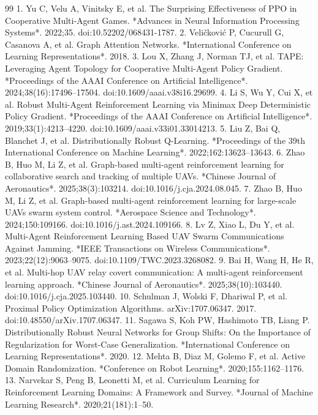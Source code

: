 \begin{thebibliography}{99}
 1. Yu C, Velu A, Vinitsky E, et al. The Surprising Effectiveness of PPO in Cooperative Multi-Agent Games. *Advances in Neural Information Processing Systems*. 2022;35. doi:10.52202/068431-1787.
 2. Veličković P, Cucurull G, Casanova A, et al. Graph Attention Networks. *International Conference on Learning Representations*. 2018.
 3. Lou X, Zhang J, Norman TJ, et al. TAPE: Leveraging Agent Topology for Cooperative Multi-Agent Policy Gradient. *Proceedings of the AAAI Conference on Artificial Intelligence*. 2024;38(16):17496--17504. doi:10.1609/aaai.v38i16.29699.
 4. Li S, Wu Y, Cui X, et al. Robust Multi-Agent Reinforcement Learning via Minimax Deep Deterministic Policy Gradient. *Proceedings of the AAAI Conference on Artificial Intelligence*. 2019;33(1):4213--4220. doi:10.1609/aaai.v33i01.33014213.
 5. Liu Z, Bai Q, Blanchet J, et al. Distributionally Robust Q-Learning. *Proceedings of the 39th International Conference on Machine Learning*. 2022;162:13623--13643.
 6. Zhao B, Huo M, Li Z, et al. Graph-based multi-agent reinforcement learning for collaborative search and tracking of multiple UAVs. *Chinese Journal of Aeronautics*. 2025;38(3):103214. doi:10.1016/j.cja.2024.08.045.
 7. Zhao B, Huo M, Li Z, et al. Graph-based multi-agent reinforcement learning for large-scale UAVs swarm system control. *Aerospace Science and Technology*. 2024;150:109166. doi:10.1016/j.ast.2024.109166.
 8. Lv Z, Xiao L, Du Y, et al. Multi-Agent Reinforcement Learning Based UAV Swarm Communications Against Jamming. *IEEE Transactions on Wireless Communications*. 2023;22(12):9063--9075. doi:10.1109/TWC.2023.3268082.
 9. Bai H, Wang H, He R, et al. Multi-hop UAV relay covert communication: A multi-agent reinforcement learning approach. *Chinese Journal of Aeronautics*. 2025;38(10):103440. doi:10.1016/j.cja.2025.103440.
 10. Schulman J, Wolski F, Dhariwal P, et al. Proximal Policy Optimization Algorithms. arXiv:1707.06347. 2017. doi:10.48550/arXiv.1707.06347.
 11. Sagawa S, Koh PW, Hashimoto TB, Liang P. Distributionally Robust Neural Networks for Group Shifts: On the Importance of Regularization for Worst-Case Generalization. *International Conference on Learning Representations*. 2020.
 12. Mehta B, Diaz M, Golemo F, et al. Active Domain Randomization. *Conference on Robot Learning*. 2020;155:1162--1176.
 13. Narvekar S, Peng B, Leonetti M, et al. Curriculum Learning for Reinforcement Learning Domains: A Framework and Survey. *Journal of Machine Learning Research*. 2020;21(181):1--50.

\end{thebibliography}
